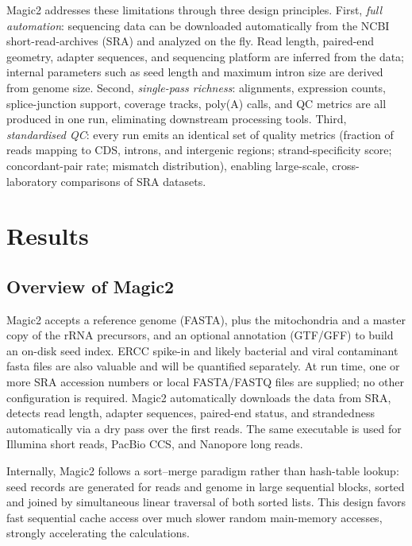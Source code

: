\documentclass[11pt]{article}
\begin{document}
Magic2 addresses these limitations through three design principles.
First, \emph{full automation}: sequencing data can be downloaded
automatically from the NCBI short-read-archives (SRA) and
analyzed on the fly. Read length, paired-end geometry, adapter
sequences, and sequencing platform are inferred from the data;
internal parameters such as seed length and maximum intron size are
derived from genome size.
Second, \emph{single-pass richness}: alignments, expression counts,
splice-junction support, coverage tracks, poly(A) calls, and QC
metrics are all produced in one run, eliminating downstream
processing tools.
Third, \emph{standardised QC}: every run emits an identical set of
quality metrics (fraction of reads mapping to CDS, introns, and
intergenic regions; strand-specificity score; concordant-pair rate;
mismatch distribution), enabling large-scale, cross-laboratory
comparisons of SRA datasets.

\section*{Results}

\subsection*{Overview of Magic2}

Magic2 accepts a reference genome (FASTA), plus the mitochondria
and a master copy of the rRNA precursors,
and an optional annotation
(GTF/GFF) to build an on-disk seed index.
ERCC spike-in and likely bacterial and viral contaminant fasta
files are also valuable and will be quantified separately.
At run time, one or more SRA accession numbers or local FASTA/FASTQ
files are supplied; no other configuration is required.
Magic2 automatically downloads the data from SRA,
detects read length, adapter sequences, paired-end status, and
strandedness automatically via a dry pass over the first reads.
The same executable is used for Illumina short reads, PacBio CCS, and
Nanopore long reads.

Internally, Magic2 follows a sort--merge paradigm rather than hash-table
lookup: seed records are generated for reads and genome in large
sequential blocks, sorted and joined by simultaneous linear
traversal of both sorted lists.
This design favors fast sequential cache access over
much slower random main-memory accesses, strongly accelerating
the calculations.
\end{document}
